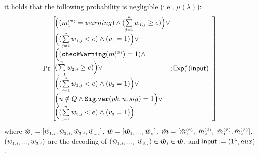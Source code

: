 \begin{definition}
it holds that the following probability is negligible (i.e., $\mu(\lambda)$):
%
%
{\small{
$$ \Pr\left[
  \begin{array}{l}
%
%
  \hs\Big((m^{\st\mathcal{(B)}}_{\st1}=warning) \wedge (\sum\limits_{\st j=1}^{\st n}w_{\st 1,j}\geq {e})\Big) 
    \vee\\ \hs \Big((\sum\limits_{\st j=1}^{\st n}w_{\st 1,j}<{e}) \wedge ( {v}_{\st 1}=1)\Big)
  
\vee\\
  \hs  \Big((\mathtt{checkWarning}(m^{\st\mathcal{(B)}}_{\st1})= 1) \wedge\\\hs (\sum\limits_{\st j=1}^{\st n}w_{\st 2,j}\geq {e})\Big)
  \vee\\\hs \Big((\sum\limits_{\st j=1}^{\st n}w_{\st 2,j}< {e}) \wedge ({v}_{\st 2}=1)\Big)
  
  \vee \\
\hs  \Big(u\notin Q \wedge\mathtt{Sig.ver}( pk,  u, sig) =1\Big) 
   \vee\\\hs \Big((\sum\limits_{\st j=1}^{\st n}w_{\st 3,j}< {e}) \wedge ( {v}_{\st 3}=1)\Big)

\end{array} \hs:
    \begin{array}{l}
  \hs  \mathsf{Exp}_{\st 1}^{\st\mathcal{A}}(\mathsf{input})\\
\end{array}    \right]$$
}}
where $\hat{\bm{w}}_{\st j}= [\hat {w}_{\st 1,j}, \hat{w}_{\st 2, j}, \hat{w}_{\st 3, j}, \hat{w}_{\st 4, j}]$, $\hat {\bm w}=[\hat {\bm w}_{\st 1},..., \hat{\bm w}_{\st n}]$, $\hat {\bm m}=[\hat {m}^{\st (\mathcal{C})}_{\st 1}, $ $\hat {m}^{\st (\mathcal{C})}_{\st 2}, $ $\hat {m}^{\st (\mathcal{B})}_{\st 1}, \hat {m}^{\st (\mathcal{B})}_{\st 2}]$, $(w_{\st 1, j},..., w_{\st 3, j})$ are the  decoding of   $(\hat w_{\st 1,j},...,$ $\hat w_{\st 3,j})\in\hat{\bm{w}}_{\st j}\in \hat {\bm w}$, and $\mathsf{input}:=(1^{\st\lambda},  {aux})$. 
%
%
\end{definition}

